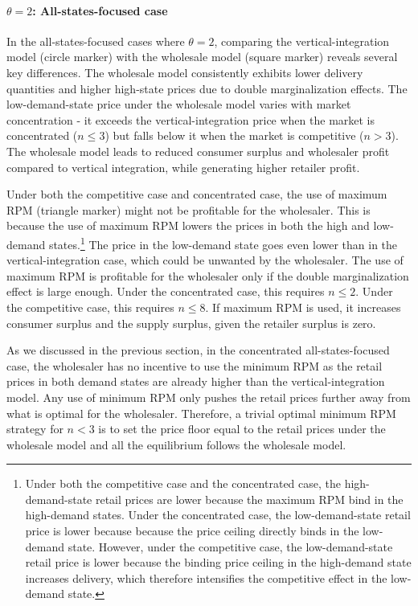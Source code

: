 \documentclass[12pt]{article}
\begin{document}
\paragraph{$\theta = 2$: All-states-focused case} In the all-states-focused cases where $\theta = 2$, comparing the vertical-integration model (circle marker) with the wholesale model (square marker) reveals several key differences. The wholesale model consistently exhibits lower delivery quantities and higher high-state prices due to double marginalization effects. The low-demand-state price under the wholesale model varies with market concentration - it exceeds the vertical-integration price when the market is concentrated ($n \leq 3$) but falls below it when the market is competitive ($n > 3$). The wholesale model leads to reduced consumer surplus and wholesaler profit compared to vertical integration, while generating higher retailer profit.

Under both the competitive case and concentrated case, the use of maximum RPM (triangle marker) might not be profitable for the wholesaler. This is because the use of maximum RPM lowers the prices in both the high and low-demand states.\footnote{Under both the competitive case and the concentrated case, the high-demand-state retail prices are lower because the maximum RPM bind in the high-demand states. Under the concentrated case, the low-demand-state retail price is lower because because the price ceiling directly binds in the low-demand state. However, under the competitive case,   the low-demand-state retail price is lower because the binding price ceiling in the high-demand state increases delivery, which therefore intensifies the competitive effect in the low-demand state.}
The price in the low-demand state goes even lower than in the vertical-integration case, which could be unwanted by the wholesaler. The use of maximum RPM is profitable for the wholesaler only if the double marginalization effect is large enough. 
Under the concentrated case, this requires $n \leq 2$. Under the competitive case, this requires $n \leq 8$. If maximum RPM is used, it increases consumer surplus and the supply surplus, given the retailer surplus is zero. 


As we discussed in the previous section, in the concentrated all-states-focused case, the wholesaler has no incentive to use the minimum RPM as the retail prices in both demand states are already higher than the vertical-integration model. Any use of minimum RPM only pushes the retail prices further away from what is optimal for the wholesaler. Therefore, a trivial optimal minimum RPM strategy for $n < 3$ is to set the price floor equal to the retail prices under the wholesale model and all the equilibrium follows the wholesale model.  
\end{document}
